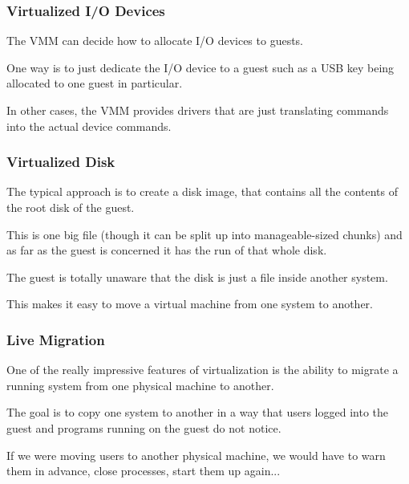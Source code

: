 \begin{frame}
\frametitle{Virtualized I/O Devices}

The VMM can decide how to allocate I/O devices to guests. 

One way is to just dedicate the I/O device to a guest such as a USB key being allocated to one guest in particular. 

In other cases, the VMM provides drivers that are just translating commands into the actual device commands. 

\end{frame}

\begin{frame}
\frametitle{Virtualized Disk}

The typical approach is to create a \alert{disk image}, that contains all the contents of the root disk of the guest. 

This is one big file (though it can be split up into manageable-sized chunks) and as far as the guest is concerned it has the run of that whole disk.

The guest is totally unaware that the disk is just a file inside another system. 

This makes it easy to move a virtual machine from one system to another.
\end{frame}

\begin{frame}
\frametitle{Live Migration}

One of the really impressive features of virtualization is the ability to migrate a running system from one physical machine to another. 

The goal is to copy one system to another in a way that users logged into the guest and programs running on the guest do not notice. 

If we were moving users to another physical machine, we would have to warn them in advance, close processes, start them up again...

\end{frame}

